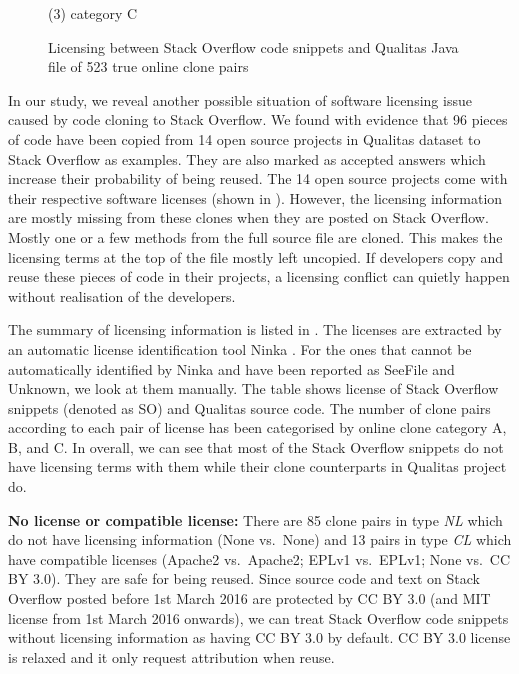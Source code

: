 \documentclass{sig-alternate-05-2015}
\begin{document}
\begin{figure}
	\caption*{(3) category C}\label{fig:heatmap_c}
	\endminipage
	\caption{Licensing between Stack Overflow code snippets and Qualitas Java file of 523 true online clone pairs}
\end{figure}

In our study, we reveal another possible situation of software licensing issue caused by code cloning to Stack Overflow. We found with evidence that 96 pieces of code have been copied from 14 open source projects in Qualitas dataset to Stack Overflow as examples. They are also marked as accepted answers which increase their probability of being reused. The 14 open source projects come with their respective software licenses (shown in ). However, the licensing information are mostly missing from these clones when they are posted on Stack Overflow. Mostly one or a few methods from the full source file are cloned. This makes the licensing terms at the top of the file mostly left uncopied. If developers copy and reuse these pieces of code in their projects, a licensing conflict can quietly happen without realisation of the developers. 

The summary of licensing information is listed in . The licenses are extracted by an automatic license identification tool Ninka \cite{German2010}. For the ones that cannot be automatically identified by Ninka and have been reported as SeeFile and Unknown, we look at them manually.  The table shows license of Stack Overflow snippets (denoted as SO) and Qualitas source code. The number of clone pairs according to each pair of license has been categorised by online clone category A, B, and C. In overall, we can see that most of the Stack Overflow snippets do not have licensing terms with them while their clone counterparts in Qualitas project do. 

\textbf{No license or compatible license:} There are 85 clone pairs in type \textit{NL} which do not have licensing information (None vs.~None) and 13 pairs in type \textit{CL} which have compatible licenses (Apache2 vs.~Apache2; EPLv1 vs.~EPLv1; None vs.~CC BY 3.0). They are safe for being reused. Since source code and text on Stack Overflow posted before 1st March 2016 are protected by CC BY 3.0 (and MIT license from 1st March 2016 onwards), we can treat Stack Overflow code snippets without licensing information as having CC BY 3.0 by default. CC BY 3.0 license is relaxed and it only request attribution when reuse. 
\end{document}
